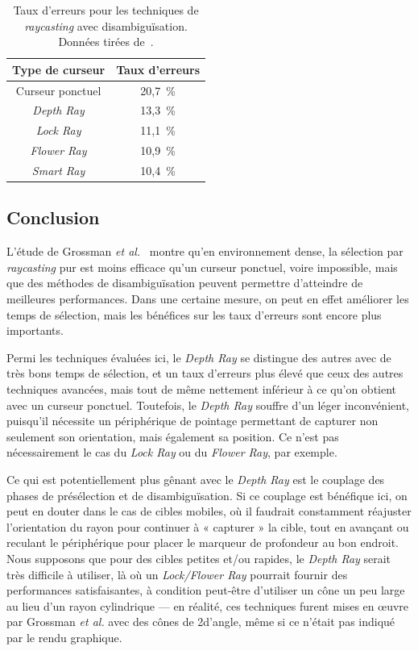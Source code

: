 	\begin{table}
	\centering
	\begin{tabular}{c c}
		Type de curseur			& Taux d'erreurs \bigstrut[b] \\ \hline
		Curseur ponctuel		& 20,7~\%{} \bigstrut[t] \\
		\emph{Depth Ray}		& 13,3~\%{} \\
		\emph{Lock Ray}			& 11,1~\%{} \\
		\emph{Flower Ray}		& 10,9~\%{} \\
		\emph{Smart Ray}		& 10,4~\%{} \\
	\end{tabular}
	\caption[Taux d'erreurs pour les techniques de \emph{raycasting} avec disambiguïsation]{Taux d'erreurs pour les techniques de \emph{raycasting} avec disambiguïsation. Données tirées de~\cite{grossman2006design}.}
	\label{tab:rayErrors}
	\end{table}
	
	\subsection{Conclusion}
	L'étude de Grossman \emph{et al.}~\cite{grossman2006design} montre qu'en environnement dense, la sélection par \emph{raycasting} pur est moins efficace qu'un curseur ponctuel, voire impossible, mais que des méthodes de disambiguïsation peuvent permettre d'atteindre de meilleures performances. Dans une certaine mesure, on peut en effet améliorer les temps de sélection, mais les bénéfices sur les taux d'erreurs sont encore plus importants.
	
	Permi les techniques évaluées ici, le \emph{Depth Ray} se distingue des autres avec de très bons temps de sélection, et un taux d'erreurs plus élevé que ceux des autres techniques avancées, mais tout de même nettement inférieur à ce qu'on obtient avec un curseur ponctuel. Toutefois, le \emph{Depth Ray} souffre d'un léger inconvénient, puisqu'il nécessite un périphérique de pointage permettant de capturer non seulement son orientation, mais également sa position. Ce n'est pas nécessairement le cas du \emph{Lock Ray} ou du \emph{Flower Ray}, par exemple.
	
	Ce qui est potentiellement plus gênant avec le \emph{Depth Ray} est le couplage des phases de présélection et de disambiguïsation. Si ce couplage est bénéfique ici, on peut en douter dans le cas de cibles mobiles, où il faudrait constamment réajuster l'orientation du rayon pour continuer à « capturer » la cible, tout en avançant ou reculant le périphérique pour placer le marqueur de profondeur au bon endroit. Nous supposons que pour des cibles petites et/ou rapides, le \emph{Depth Ray} serait très difficile à utiliser, là où un \emph{Lock/Flower Ray} pourrait fournir des performances satisfaisantes, à condition peut-être d'utiliser un cône un peu large au lieu d'un rayon cylindrique --- en réalité, ces techniques furent mises en \oe{}uvre par Grossman \emph{et al.} avec des cônes de 2\textdegree d'angle, même si ce n'était pas indiqué par le rendu graphique.
	
